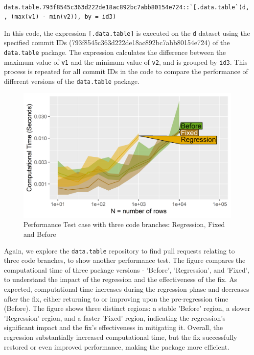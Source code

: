     \begin{verbatim}
    data.table.793f8545c363d222de18ac892bc7abb80154e724::`[.data.table`(d, , (max(v1) - min(v2)), by = id3)  
    \end{verbatim}
    
\vspace{0.1in}
\noindent In this code, the expression \texttt{[.data.table]} is executed on the \texttt{d} dataset using the specified commit IDs (793f8545c363d222de18ac892bc7abb80154e724) of the \texttt{data.table} package. The expression calculates the difference between the maximum value of \texttt{v1} and the minimum value of \texttt{v2}, and is grouped by \texttt{id3}. This process is repeated for all commit IDs in the code to compare the performance of different versions of the \texttt{data.table} package.\\

\begin{figure}[H]
    \centering
    \includegraphics[width=0.7\linewidth]{figures/atime.list.4200.png}
    \caption{Performance Test case with three code branches: Regression, Fixed and Before}
    \label{fig:label4}
\end{figure}

\noindent Again, we explore the \texttt{data.table} repository to find pull requests relating to three code branches, to show another performance test. The figure compares the computational time of three package versions - 'Before', 'Regression', and 'Fixed', to understand the impact of the regression and the effectiveness of the fix. As expected, computational time increases during the regression phase and decreases after the fix, either returning to or improving upon the pre-regression time (Before). The figure shows three distinct regions: a stable 'Before' region, a slower 'Regression' region, and a faster 'Fixed' region, indicating the regression's significant impact and the fix's effectiveness in mitigating it. Overall, the regression substantially increased computational time, but the fix successfully restored or even improved performance, making the package more efficient.\\



